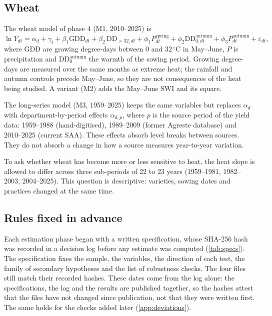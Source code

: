 \subsection{Wheat}

The wheat model of phase 4 (M1, 2010--2025) is
\begin{equation}
\label{eq:m1}
\ln Y_{dt} = \alpha_d + \gamma_t + \beta_1 \mathrm{GDD}_{dt} + \beta_2\, \mathrm{DD}_{>32,dt} + \phi_1 P^{\mathrm{spring}}_{dt} + \phi_2 \mathrm{DD}^{\mathrm{autumn}}_{0,dt} + \phi_3 P^{\mathrm{autumn}}_{dt} + \varepsilon_{dt},
\end{equation}
where GDD are growing degree-days between 0 and 32\,$^{\circ}$C in May--June, $P$ is precipitation and $\mathrm{DD}^{\mathrm{autumn}}_{0}$ the warmth of the sowing period. Growing degree-days are measured over the same months as extreme heat; the rainfall and autumn controls precede May--June, so they are not consequences of the heat being studied. A variant (M2) adds the May--June SWI and its square.

The long-series model (M3, 1959--2025) keeps the same variables but replaces $\alpha_d$ with department-by-period effects $\alpha_{d,p}$, where $p$ is the source period of the yield data: 1959--1988 (hand-digitised), 1989--2009 (former Agreste database) and 2010--2025 (current SAA). These effects absorb level breaks between sources. They do not absorb a change in how a source measures year-to-year variation.

To ask whether wheat has become more or less sensitive to heat, the heat slope is allowed to differ across three sub-periods of 22 to 23 years (1959--1981, 1982--2003, 2004--2025). This question is descriptive: varieties, sowing dates and practices changed at the same time.

\subsection{Rules fixed in advance}

Each estimation phase began with a written specification, whose SHA-256 hash was recorded in a decision log before any estimate was computed (\cref{tab:specs}). The specification fixes the sample, the variables, the direction of each test, the family of secondary hypotheses and the list of robustness checks. The four files still match their recorded hashes. These dates come from the log alone: the specifications, the log and the results are published together, so the hashes attest that the files have not changed since publication, not that they were written first. The same holds for the checks added later (\cref{app:deviations}).


